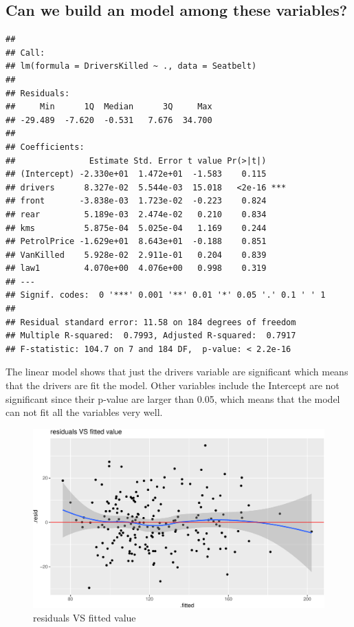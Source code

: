 \documentclass[11pt,a4paper,]{article}
\begin{document}
\hypertarget{can-we-build-an-model-among-these-variables}{%
\subsection{Can we build an model among these variables?}\label{can-we-build-an-model-among-these-variables}}

\begin{verbatim}
## 
## Call:
## lm(formula = DriversKilled ~ ., data = Seatbelt)
## 
## Residuals:
##     Min      1Q  Median      3Q     Max 
## -29.489  -7.620  -0.531   7.676  34.700 
## 
## Coefficients:
##               Estimate Std. Error t value Pr(>|t|)    
## (Intercept) -2.330e+01  1.472e+01  -1.583    0.115    
## drivers      8.327e-02  5.544e-03  15.018   <2e-16 ***
## front       -3.838e-03  1.723e-02  -0.223    0.824    
## rear         5.189e-03  2.474e-02   0.210    0.834    
## kms          5.875e-04  5.025e-04   1.169    0.244    
## PetrolPrice -1.629e+01  8.643e+01  -0.188    0.851    
## VanKilled    5.928e-02  2.911e-01   0.204    0.839    
## law1         4.070e+00  4.076e+00   0.998    0.319    
## ---
## Signif. codes:  0 '***' 0.001 '**' 0.01 '*' 0.05 '.' 0.1 ' ' 1
## 
## Residual standard error: 11.58 on 184 degrees of freedom
## Multiple R-squared:  0.7993, Adjusted R-squared:  0.7917 
## F-statistic: 104.7 on 7 and 184 DF,  p-value: < 2.2e-16
\end{verbatim}

The linear model shows that just the drivers variable are significant which means that the drivers are fit the model. Other variables include the Intercept are not significant since their p-value are larger than 0.05, which means that the model can not fit all the variables very well.

\clearpage

\begin{figure}
\centering
\includegraphics{report_files/figure-latex/residuals-1.pdf}
\caption{\label{fig:residuals}residuals VS fitted value}
\end{figure}
\end{document}

